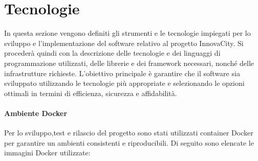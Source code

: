 \section{Tecnologie}
In questa sezione vengono definiti gli strumenti e le tecnologie impiegati per lo sviluppo e l'implementazione del software relativo al progetto InnovaCity. Si procederà quindi con la descrizione delle tecnologie e dei linguaggi di programmazione utilizzati, delle librerie e dei framework necessari, nonché delle infrastrutture richieste. L'obiettivo principale è garantire che il software sia sviluppato utilizzando le tecnologie più appropriate e selezionando le opzioni ottimali in termini di efficienza, sicurezza e affidabilità.

\paragraph*{Ambiente Docker}
Per lo sviluppo,test e rilascio del progetto sono stati utilizzati container Docker per garantire un ambienti consistenti e riproducibili. Di seguito sono elencate le immagini Docker utilizzate:

